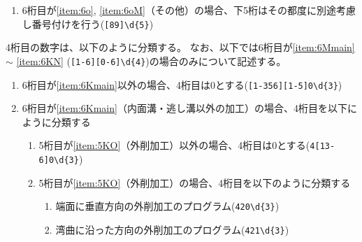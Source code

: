 \begin{enumerate}[label=\alph*)]
\begin{enumerate}[label=\arabic*., ref=\arabic*, start=0]
  \item\label{item:5Kaux} 加工の種類に依存しない加工のプログラム(\verb|40\d{4}|)
  \item\label{item:5KF} 端面の加工のプログラム(\verb|41\d{4}|)
  \item\label{item:5KO} 外削の加工のプログラム(\verb|42\d{4}|)
  \item\label{item:5KK} 溝の加工のプログラム(\verb|43\d{4}|)
  \item\label{item:5KCO} 外側面取の加工のプログラム(\verb|44\d{4}|)
  \item\label{item:5KCI} 内側面取の加工のプログラム(\verb|45\d{4}|)
  \item\label{item:5KZ} 座ぐりの加工のプログラム(\verb|46\d{4}|)
  \end{enumerate}
\item 6桁目が\ref{item:6o}, \ref{item:6oM}（その他）の場合、下5桁はその都度に別途考慮し番号付けを行う(\verb|[89]\d{5}|)
\end{enumerate}


4桁目の数字は、以下のように分類する。
なお、以下では6桁目が\ref{item:6Mmain} $\sim$ \ref{item:6KN} (\verb|[1-6][0-6]\d{4}|)の場合のみについて記述する。
\begin{enumerate}[label=\alph*), ref=\alph*)]
\item 6桁目が\ref{item:6Kmain}\hx 以外の場合、4桁目は0とする(\verb|[1-356][1-5]0\d{3}|)
\item 6桁目が\ref{item:6Kmain}（内面溝・逃し溝以外の加工）の場合、4桁目を以下にように分類する
  \begin{enumerate}[label=\alph{enumi}\,-\arabic*), leftmargin=\leftmargini]
  \item 5桁目が\ref{item:5KO}（外削加工）以外の場合、4桁目は0とする(\verb|4[13-6]0\d{3}|)
  \item 5桁目が\ref{item:5KO}（外削加工）の場合、4桁目を以下のように分類する
    \begin{enumerate}[label=\arabic*., ref=\arabic*, start=0, leftmargin=*]
    \item 端面に垂直方向の外削加工のプログラム(\verb|420\d{3}|)
    \item 湾曲に沿った方向の外削加工のプログラム(\verb|421\d{3}|)
    \end{enumerate}
  \end{enumerate}
\end{enumerate}



